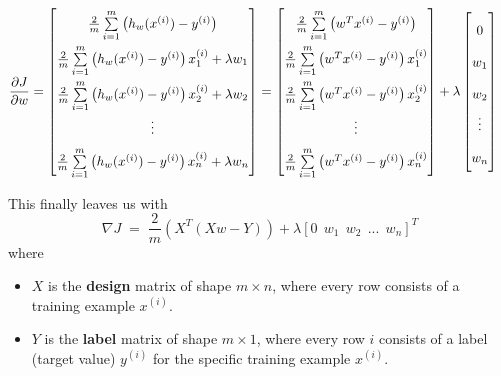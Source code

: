 \documentclass[12pt]{report}
\begin{document}
\begin{align*}
    \frac{\partial J}{\partial w} &=
    \renewcommand\arraystretch{2.0}
        \begin{bmatrix}
            \frac{2}{m} \sum\limits_{i=1}^m \left(h_w(x^{(i)}) - y^{(i)} \right) \\
            \frac{2}{m} \sum\limits_{i=1}^m \left(h_w(x^{(i)}) - y^{(i)} \right)x_1^{(i)} + \lambda w_1 \\
            \frac{2}{m} \sum\limits_{i=1}^m \left(h_w(x^{(i)}) - y^{(i)} \right)x_2^{(i)} + \lambda w_2 \\
            \vdots \\
            \frac{2}{m} \sum\limits_{i=1}^m \left(h_w(x^{(i)}) - y^{(i)} \right)x_n^{(i)} + \lambda w_n
        \end{bmatrix}
    =
    \begin{bmatrix}
        \frac{2}{m} \sum\limits_{i=1}^m \left(w^Tx^{(i)} - y^{(i)} \right) \\
        \frac{2}{m} \sum\limits_{i=1}^m \left(w^Tx^{(i)} - y^{(i)} \right)x_1^{(i)} \\
        \frac{2}{m} \sum\limits_{i=1}^m \left(w^Tx^{(i)} - y^{(i)} \right)x_2^{(i)} \\
        \vdots \\
        \frac{2}{m} \sum\limits_{i=1}^m \left(w^Tx^{(i)} - y^{(i)} \right)x_n^{(i)} 
    \end{bmatrix}
    + \lambda
    \begin{bmatrix}
        0 \\
        w_1 \\
        w_2 \\
        \vdots \\
        w_n
    \end{bmatrix}
\end{align*}

\noindent This finally leaves us with
$$\nabla J \;=\;
\frac{2}{m}\left(X^T\left(Xw - Y\right)\right) +
\lambda[0 \,\; w_1 \,\; w_2 \,\; ... \,\; w_n]^T$$
\noindent where
\begin{itemize}
    \item $X$ is the \textbf{design} matrix of shape $m \times n$, where every row consists of a training example $x^{(i)}$.
    \item $Y$ is the \textbf{label} matrix of shape $m \times 1$, where every row $i$ consists of a label (target value) $y^{(i)}$ for the specific training example $x^{(i)}$.
\end{itemize} \clearpage
\end{document}
